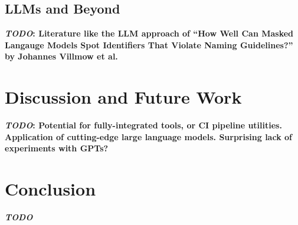 \documentclass[conference]{IEEEtran}
\newcommand{\TODO}[1]{\textbf{\textcolor{Bittersweet}{#1}}\xspace}
\newcommand{\TODOM}[1]{\TODO{\emph{TODO}: #1}\xspace}
\newcommand{\TODOB}{\TODO{\emph{TODO}}\xspace}
\begin{document}
\subsection{LLMs and Beyond }
\label{ssec:LLMs-and-Beyond }
\TODOM{Literature like the LLM approach of ``How Well Can Masked Langauge Models Spot
Identifiers That Violate Naming Guidelines?'' by Johannes Villmow et
al.\cite{Villmow2023Violations}}


\section{Discussion and Future Work}
\label{sec:Discussion-and-Future-Work}

\TODOM{Potential for fully-integrated tools, or CI pipeline utilities. Application of
cutting-edge large language models. Surprising lack of experiments with GPTs?}

\section{Conclusion}
\label{sec:Conclusion}

\TODOB


\nocite{*}



\onecolumn
{}
\end{document}
